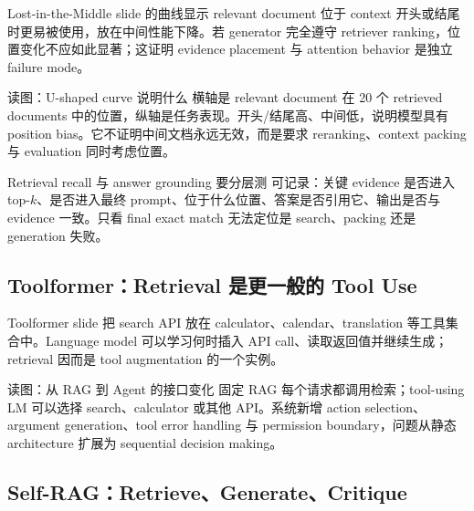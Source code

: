 Lost-in-the-Middle slide 的曲线显示 relevant document 位于 context 开头或结尾时更易被使用，放在中间性能下降。若 generator 完全遵守 retriever ranking，位置变化不应如此显著；这证明 evidence placement 与 attention behavior 是独立 failure mode。


\begin{knowledgebox}{读图：U-shaped curve 说明什么}
横轴是 relevant document 在 20 个 retrieved documents 中的位置，纵轴是任务表现。开头/结尾高、中间低，说明模型具有 position bias。它不证明中间文档永远无效，而是要求 reranking、context packing 与 evaluation 同时考虑位置。
\end{knowledgebox}

\begin{warningbox}{Retrieval recall 与 answer grounding 要分层测}
可记录：关键 evidence 是否进入 top-$k$、是否进入最终 prompt、位于什么位置、答案是否引用它、输出是否与 evidence 一致。只看 final exact match 无法定位是 search、packing 还是 generation 失败。
\end{warningbox}

\subsection{Toolformer：Retrieval 是更一般的 Tool Use}

Toolformer slide 把 search API 放在 calculator、calendar、translation 等工具集合中。Language model 可以学习何时插入 API call、读取返回值并继续生成；retrieval 因而是 tool augmentation 的一个实例。


\begin{knowledgebox}{读图：从 RAG 到 Agent 的接口变化}
固定 RAG 每个请求都调用检索；tool-using LM 可以选择 search、calculator 或其他 API。系统新增 action selection、argument generation、tool error handling 与 permission boundary，问题从静态 architecture 扩展为 sequential decision making。
\end{knowledgebox}


\subsection{Self-RAG：Retrieve、Generate、Critique}

